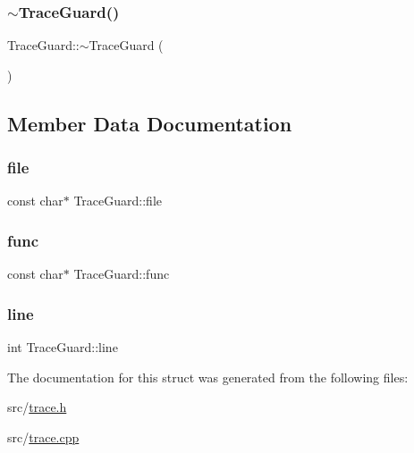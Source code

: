 \mbox{\label{struct_trace_guard_a0b8afa7299b57caff329144176986288}} 
\subsubsection{\texorpdfstring{$\sim$\+Trace\+Guard()}{~TraceGuard()}}
{\footnotesize\ttfamily Trace\+Guard\+::$\sim$\+Trace\+Guard (\begin{DoxyParamCaption}{ }\end{DoxyParamCaption})\hspace{0.3cm}{\ttfamily [noexcept]}}



\subsection{Member Data Documentation}
\mbox{\label{struct_trace_guard_a9629dd2d4daa8cf6858ac79002b58930}} 
\subsubsection{\texorpdfstring{file}{file}}
{\footnotesize\ttfamily const char$\ast$ Trace\+Guard\+::file}

\mbox{\label{struct_trace_guard_a97f3698b1e93174f750b87e80ae9d7d5}} 
\subsubsection{\texorpdfstring{func}{func}}
{\footnotesize\ttfamily const char$\ast$ Trace\+Guard\+::func}

\mbox{\label{struct_trace_guard_a47010bc1461b9bcc153b75a36ab01feb}} 
\subsubsection{\texorpdfstring{line}{line}}
{\footnotesize\ttfamily int Trace\+Guard\+::line}



The documentation for this struct was generated from the following files\+:\begin{DoxyCompactItemize}
\item 
src/\hyperlink{trace_8h}{trace.\+h}\item 
src/\hyperlink{trace_8cpp}{trace.\+cpp}\end{DoxyCompactItemize}
